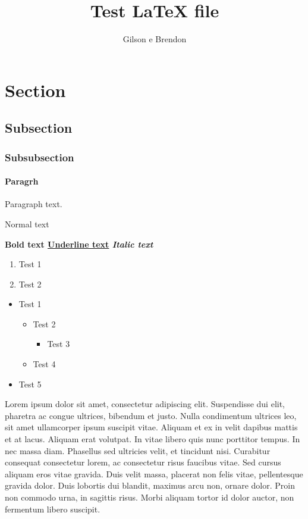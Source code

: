 \documentclass[12pt]{article}
\title{Test LaTeX file}
\author{Gilson e Brendon}
\begin{document}
\maketitle

\section{Section}
\subsection{Subsection}
\subsubsection{Subsubsection}
\paragraph{Paragrh} Paragraph text.

Normal text

\bf{Bold text}
\underline{Underline text}
\it{Italic text}

\begin{enumerate}
\item Test 1
\item Test 2
\end{enumerate}

\begin{itemize}

\item Test 1

\begin{itemize}

\item Test 2

\begin{itemize}

\item Test 3

\end{itemize}

\item Test 4

\end{itemize}

\item Test 5

\end{itemize}

Lorem ipsum dolor sit amet, consectetur adipiscing elit. Suspendisse dui elit, pharetra ac congue ultrices, bibendum et justo. Nulla condimentum ultrices leo, sit amet ullamcorper ipsum suscipit vitae. Aliquam et ex in velit dapibus mattis et at lacus. Aliquam erat volutpat. In vitae libero quis nunc porttitor tempus. In nec massa diam. Phasellus sed ultricies velit, et tincidunt nisi. Curabitur consequat consectetur lorem, ac consectetur risus faucibus vitae. Sed cursus aliquam eros vitae gravida. Duis velit massa, placerat non felis vitae, pellentesque gravida dolor. Duis lobortis dui blandit, maximus arcu non, ornare dolor. Proin non commodo urna, in sagittis risus. Morbi aliquam tortor id dolor auctor, non fermentum libero suscipit.
\end{document}
